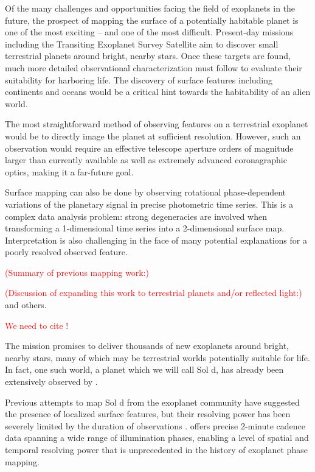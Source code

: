 \documentclass[modern]{aastex62}
\newcommand{\todo}[1]{\textcolor{red}{#1}}
\begin{document}
Of the many challenges and opportunities facing the field of exoplanets in the future, the prospect of mapping the surface of a potentially habitable planet is one of the most exciting -- and one of the most difficult. 
Present-day missions including the Transiting Exoplanet Survey Satellite \citep[\TESS; ][]{Ricker2015} aim to discover small terrestrial planets around bright, nearby stars. 
Once these targets are found, much more detailed observational characterization must follow to evaluate their suitability for harboring life. 
The discovery of surface features including continents and oceans would be a critical hint towards the habitability of an alien world.

The most straightforward method of observing features on a terrestrial exoplanet would be to directly image the planet at sufficient resolution. 
However, such an observation would require an effective telescope aperture orders of magnitude larger than currently available as well as extremely advanced coronagraphic optics, making it a far-future goal. 

Surface mapping can also be done by observing rotational phase-dependent variations of the planetary signal in precise photometric time series. 
This is a complex data analysis problem: strong degeneracies are involved when transforming a 1-dimensional time series into a 2-dimensional surface map. 
Interpretation is also challenging in the face of many potential explanations for a poorly resolved observed feature. 

\todo{(Summary of previous mapping work:)}\citep{Knutson2007,Majeau2012,deWit2012}


\todo{(Discussion of expanding this work to terrestrial planets and/or reflected light:)} \citep{Berdyugina2017,Cowan2009,Cowan2018,Haggard2018,Kawahara2010,Fujii2012,Lustig-Yaeger2018} and others.


\todo{We need to cite \cite{Sagan1993}!}

The \TESS mission promises to deliver thousands of new exoplanets around bright, nearby stars, many of which may be terrestrial worlds potentially suitable for life. 
In fact, one such world, a planet which we will call Sol d, has already been extensively observed by \TESS.

Previous attempts to map Sol d from the exoplanet community have suggested 
the presence of localized surface features, but their resolving power has been 
severely limited by the duration of observations \citep{Cowan2009}. 
\TESS offers precise 2-minute cadence data spanning a wide range of illumination 
phases, enabling a level of spatial and temporal resolving power that is 
unprecedented in the history of exoplanet phase mapping. 
\end{document}
